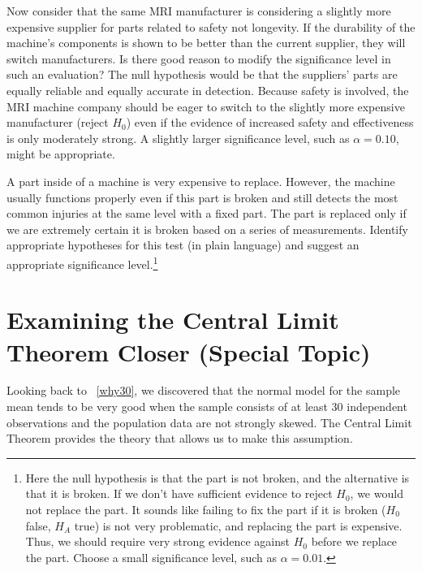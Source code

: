 \begin{example}{Now consider that the same MRI manufacturer is considering a slightly more expensive supplier for parts related to safety not longevity. If the durability of the machine's components is shown to be better than the current supplier, they will switch manufacturers. Is there good reason to modify the significance level in such an evaluation?}
The null hypothesis would be that the suppliers' parts are equally reliable and equally accurate in detection. Because safety is involved, the MRI machine company should be eager to switch to the slightly more expensive manufacturer (reject $H_0$) even if the evidence of increased safety and effectiveness is only moderately strong. A slightly larger significance level, such as $\alpha=0.10$, might be appropriate.
\end{example}

\begin{exercise}
A part inside of a machine is very expensive to replace. However, the machine usually functions properly even if this part is broken and still detects the most common injuries at the same level with a fixed part. The part is replaced only if we are extremely certain it is broken based on a series of measurements. Identify appropriate hypotheses for this test (in plain language) and suggest an appropriate significance level.\footnote{Here the null hypothesis is that the part is not broken, and the alternative is that it is broken. If we don't have sufficient evidence to reject $H_0$, we would not replace the part. It sounds like failing to fix the part if it is broken ($H_0$ false, $H_A$ true) is not very problematic, and replacing the part is expensive. Thus, we should require very strong evidence against $H_0$ before we replace the part. Choose a small significance level, such as $\alpha=0.01$.}
\end{exercise}


\section{Examining the Central Limit Theorem Closer (Special Topic)}
\label{cltSection}


Looking back to ~\ref{why30}, we discovered that the normal model for the sample mean tends to be very good when the sample consists of at least 30 independent observations and the population data are not strongly skewed. The Central Limit Theorem provides the theory that allows us to make this assumption.


